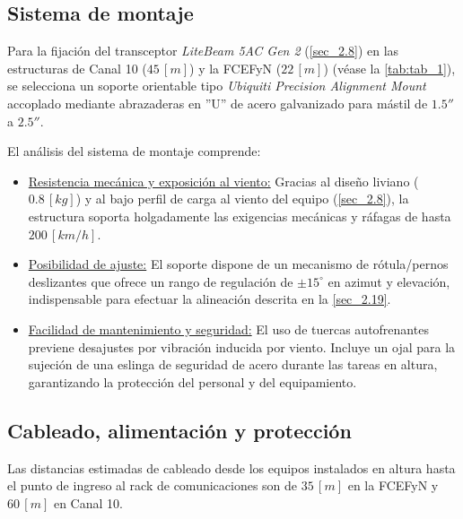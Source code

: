 \subsection{Sistema de montaje}
\label{sec_2.20}
Para la fijación del transceptor \textit{LiteBeam 5AC Gen 2} (\autoref{sec_2.8}) en las estructuras de Canal 10 ($45 \, [m]$) y la FCEFyN ($22 \, [m]$) (véase la \autoref{tab:tab_1}), se selecciona un soporte orientable tipo \textit{Ubiquiti Precision Alignment Mount} accoplado mediante abrazaderas en ''U'' de acero galvanizado para mástil de $1.5''$ a $2.5''$.

El análisis del sistema de montaje comprende:
\begin{itemize}
    \item \underline{Resistencia mecánica y exposición al viento:} Gracias al diseño liviano ($0.8 \, [kg]$) y al bajo perfil de carga al viento del equipo (\autoref{sec_2.8}), la estructura soporta holgadamente las exigencias mecánicas y ráfagas de hasta $200 \, [km/h]$.
    \item \underline{Posibilidad de ajuste:} El soporte dispone de un mecanismo de rótula/pernos deslizantes que ofrece un rango de regulación de $\pm 15^{\circ}$ en azimut y elevación, indispensable para efectuar la alineación descrita en la \autoref{sec_2.19}.
    \item \underline{Facilidad de mantenimiento y seguridad:} El uso de tuercas autofrenantes previene desajustes por vibración inducida por viento. Incluye un ojal para la sujeción de una eslinga de seguridad de acero durante las tareas en altura, garantizando la protección del personal y del equipamiento.
\end{itemize}



\subsection{Cableado, alimentación y protección}
\label{sec_2.21}
Las distancias estimadas de cableado desde los equipos instalados en altura hasta el punto de ingreso al rack de comunicaciones son de $35 \, [m]$ en la FCEFyN y $60 \, [m]$ en Canal 10. 

